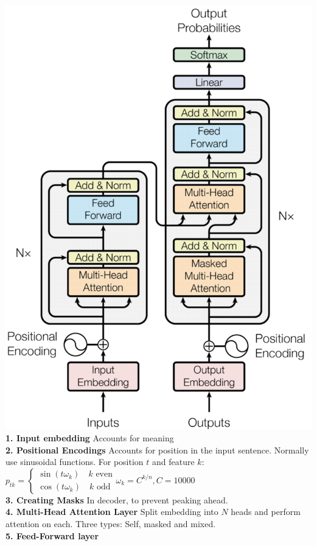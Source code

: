 \includegraphics[scale=0.25]{transformer.png}\\
\textbf{1. Input embedding} Accounts for meaning\\
\textbf{2. Positional Encodings} Accounts for position in the input sentence. Normally use sinusoidal functions. For position $t$ and feature $k$:\\ $p_{tk}=\begin{cases} \sin(t\omega_k) \quad k \text{ even} \\ \cos(t\omega_k) \quad k \text{ odd} \end{cases} \omega_k=C^{k/n}, C=10000$\\
\textbf{3. Creating Masks} In decoder, to prevent peaking ahead.\\
\textbf{4. Multi-Head Attention Layer} Split embedding into $N$ heads and perform attention on each. Three types: Self, masked and mixed.\\
\textbf{5. Feed-Forward layer}
